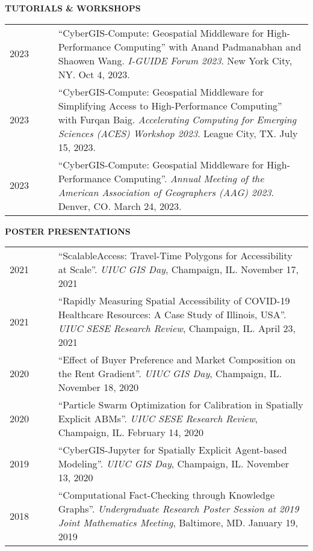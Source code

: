 \documentclass{acmcv}
\begin{document}
    \vspace{0.15cm}\textbf{\uppercase{Tutorials \& Workshops}}
    \begin{longtable}{p{0.16\linewidth} p{0.84\linewidth}}
        2023 & ``CyberGIS-Compute: Geospatial Middleware for High-Performance Computing'' with Anand Padmanabhan and Shaowen Wang. \textit{I-GUIDE Forum 2023}. New York City, NY. Oct 4, 2023.\\

        2023 & ``CyberGIS-Compute: Geospatial Middleware for Simplifying Access to High-Performance Computing'' with Furqan Baig. \textit{Accelerating Computing for Emerging Sciences (ACES) Workshop 2023}. League City, TX. July 15, 2023.\\

        2023 & ``CyberGIS-Compute: Geospatial Middleware for High-Performance Computing''. \textit{Annual Meeting of the American Association of Geographers (AAG) 2023}. Denver, CO. March 24, 2023.\\

    \end{longtable}
    \pagebreak
    \vspace{0.15cm}\textbf{\uppercase{Poster Presentations}}

    \begin{longtable}{p{0.16\linewidth} p{0.84\linewidth}}
        2021 & ``ScalableAccess: Travel-Time Polygons for Accessibility at Scale''. \textit{UIUC GIS Day}, Champaign, IL. November 17, 2021 \\

        2021 & ``Rapidly Measuring Spatial Accessibility of COVID-19 Healthcare Resources: A Case Study of Illinois, USA''. \textit{UIUC SESE Research Review}, Champaign, IL. April 23, 2021 \\ 

        2020 & ``Effect of Buyer Preference and Market Composition on the Rent Gradient''. \textit{UIUC GIS Day}, Champaign, IL. November 18, 2020 \\

        2020 & ``Particle Swarm Optimization for Calibration in Spatially Explicit ABMs''. \textit{UIUC SESE Research Review}, Champaign, IL. February 14, 2020 \\ 

        2019 & ``CyberGIS-Jupyter for Spatially Explicit Agent-based Modeling''. \textit{UIUC GIS Day}, Champaign, IL. November 13, 2020 \\

        2018 & ``Computational Fact-Checking through Knowledge Graphs''. \textit{Undergraduate Research Poster Session at 2019 Joint Mathematics Meeting}, Baltimore, MD. January 19, 2019 \\
    \end{longtable}
\end{document}
